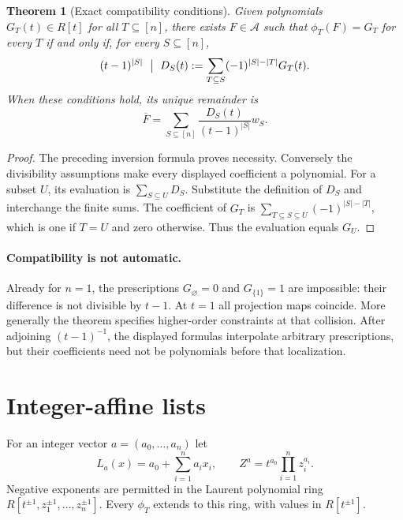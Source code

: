 \documentclass[11pt]{article}
\newtheorem{theorem}{Theorem}
\begin{document}
\begin{theorem}[Exact compatibility conditions]
Given polynomials $G_T(t)\in R[t]$ for all $T\subseteq[n]$, there
exists $F\in\mathcal A$ such that $\phi_T(F)=G_T$ for every $T$
if and only if, for every $S\subseteq[n]$,
\[
 (t-1)^{|S|}\ \bigm|\
 D_S(t):=\sum_{T\subseteq S}(-1)^{|S|-|T|}G_T(t).
\]
When these conditions hold, its unique remainder is
\[
 \overline F=\sum_{S\subseteq[n]}
       \frac{D_S(t)}{(t-1)^{|S|}}w_S.
\]
\end{theorem}
\begin{proof}
The preceding inversion formula proves necessity. Conversely the
divisibility assumptions make every displayed coefficient a polynomial.
For a subset $U$, its evaluation is $\sum_{S\subseteq U}D_S$.
Substitute the definition of $D_S$ and interchange the finite sums.
The coefficient of $G_T$ is
$\sum_{T\subseteq S\subseteq U}(-1)^{|S|-|T|}$, which is one
if $T=U$ and zero otherwise. Thus the evaluation equals $G_U$.
\end{proof}

\paragraph{Compatibility is not automatic.}
Already for $n=1$, the prescriptions $G_\varnothing=0$ and
$G_{\{1\}}=1$ are impossible: their difference is not divisible
by $t-1$. At $t=1$ all projection maps coincide. More generally
the theorem specifies higher-order constraints at that collision.
After adjoining $(t-1)^{-1}$, the displayed formulas interpolate
arbitrary prescriptions, but their coefficients need not be
polynomials before that localization.

\section{Integer-affine lists}

For an integer vector $a=(a_0,\ldots,a_n)$ let
\[
 L_a(x)=a_0+\sum_{i=1}^n a_ix_i,\qquad
 Z^a=t^{a_0}\prod_{i=1}^n z_i^{a_i}.
\]
Negative exponents are permitted in the Laurent polynomial ring
$R[t^{\pm1},z_1^{\pm1},\ldots,z_n^{\pm1}]$.
Every $\phi_T$ extends to this ring, with values in $R[t^{\pm1}]$.
\end{document}
